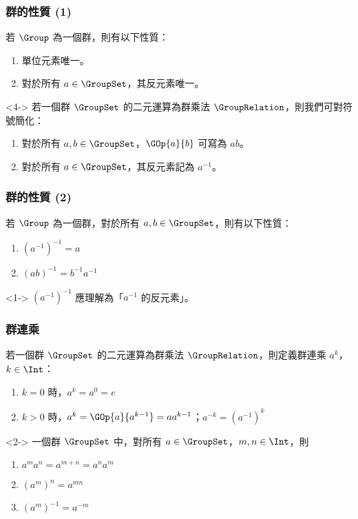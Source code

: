 \documentclass[utf8]{beamer}
\begin{document}
\begin{CJK}{UTF8}{bkai}
\begin{frame}
  \frametitle{群的性質 (1)}
  \begin{mypropo}
  \label{pro_group_identity_inverse}
  若 $\Group$ 為一個群，則有以下性質：
  \begin{enumerate}
  \item<2-> 單位元素唯一。
  \item<3-> 對於所有 $a\in{\GroupSet}$，其反元素唯一。
  \end{enumerate}
  \end{mypropo}
  \begin{mydef}[符號簡化]<4->
  \label{def:group:symbols_simplify}
  若一個群 $\GroupSet$ 的二元運算為群乘法 $\GroupRelation$，則我們可對符號簡化：
  \begin{enumerate}
  \item 對於所有 $a,b\in{\GroupSet}$，$\GOp{a}{b}$ 可寫為 $ab$。
  \item 對於所有 $a\in{\GroupSet}$，其反元素記為 $a^{-1}$。
  \end{enumerate}
  \end{mydef}
\end{frame}

\begin{frame}
  \frametitle{群的性質 (2)}
  \begin{mypropo}
  \label{def:group:inverse_property}
  若 $\Group$ 為一個群，對於所有 $a,b\in{\GroupSet}$，則有以下性質：
  \begin{enumerate}
  \item<2-> ${\left({a^{-1}}\right)}^{-1}=a$
  \item<3-> ${\left({ab}\right)}^{-1}=b^{-1}a^{-1}$
  \end{enumerate}
  \end{mypropo}
  \begin{mynote*}<1->
  ${\left({a^{-1}}\right)}^{-1}$ 應理解為「$a^{-1}$ 的反元素」。
  \end{mynote*}
\end{frame}

\begin{frame}
  \frametitle{群連乘}
  \begin{mydef}[群連乘]
  \label{def:group:group_multiplication}
  若一個群 $\GroupSet$ 的二元運算為群乘法 $\GroupRelation$，則定義群連乘 $a^k$，$k\in{\Int}$：
  \begin{enumerate}
  \item $k=0$ 時，$a^k=a^0=e$
  \item $k>0$ 時，$a^k=\GOp{a}{a^{k-1}}=aa^{k-1}$；$a^{-k}={(a^{-1})}^k$
  \end{enumerate}
  \end{mydef}
  \begin{mycorol}<2->
  一個群 $\GroupSet$ 中，對所有 $a\in{\GroupSet}$，$m,n\in{\Int}$，則
  \begin{enumerate}
  \item<2-> ${a^m}{a^n}=a^{m+n}={a^n}{a^m}$
  \item<3-> ${({a^m})}^n=a^{mn}$
  \item<4-> ${({a^m})}^{-1}=a^{-m}$
  \end{enumerate}
  \end{mycorol}
\end{frame}


\end{CJK}
\end{document}
